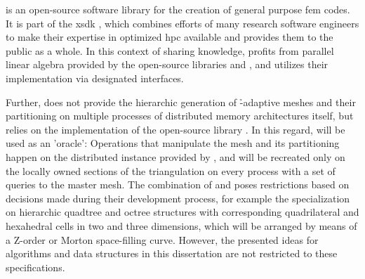 \dealii{} is an open-source software library for the creation of general purpose \gls{fem} codes.
It is part of the \gls{xsdk} \parencite{bartlett2017,xsdk050},
which combines efforts of many research software engineers to make their expertise in optimized \gls{hpc} available and provides them to the public as a whole.
In this context of sharing knowledge, \dealii{} profits from parallel linear algebra provided by the open-source libraries \trilinos{} \parencite{heroux2005,trilinos12181} and \petsc{} \parencite{balay2019,petsc3124}, and utilizes their implementation via designated interfaces.

Further, \dealii{} does not provide the hierarchic generation of \h-adaptive meshes and their partitioning on multiple processes of distributed memory architectures itself, but relies on the implementation of the open-source library \pforest{} \parencite{burstedde2011, p4est22}. In this regard, \pforest{} will be used as an 'oracle': Operations that manipulate the mesh and its partitioning happen on the distributed instance provided by \pforest{}, and will be recreated only on the locally owned sections of the \dealii{} triangulation
on every process with a set of queries to the master mesh.
The combination of \dealii{} and \pforest{} poses restrictions based on decisions made during their development process, for example the specialization on hierarchic quadtree and octree structures with corresponding quadrilateral and hexahedral cells in two and three dimensions, which will be arranged by means of a Z-order or Morton space-filling curve.
However, the presented ideas for algorithms and data structures in this dissertation are not restricted to these specifications.

